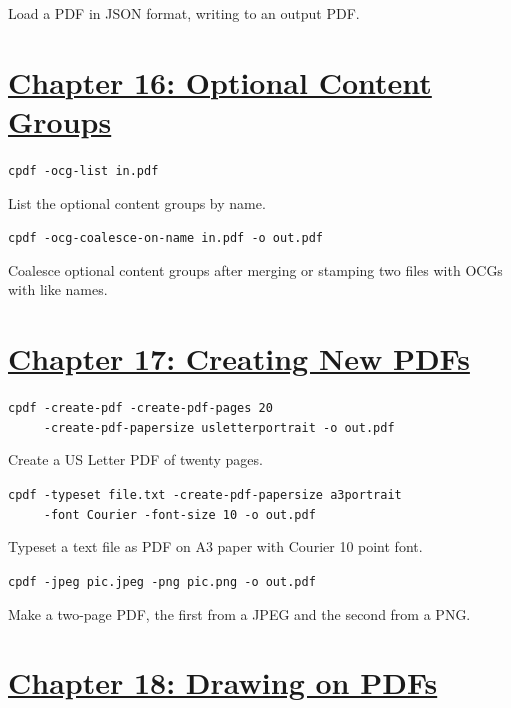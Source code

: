 \documentclass{book}
\begin{document}
\noindent Load a PDF in JSON format, writing to an output PDF.

\section*{\hyperref[chap:16]{Chapter 16: Optional Content Groups}}

\begin{framed}\noindent\texttt{cpdf -ocg-list in.pdf}\end{framed}

\noindent List the optional content groups by name.

\begin{framed}\noindent\texttt{cpdf -ocg-coalesce-on-name in.pdf -o out.pdf}\end{framed}

\noindent Coalesce optional content groups after merging or stamping two files with OCGs with like names.

\section*{\hyperref[chap:17]{Chapter 17: Creating New PDFs}}

\begin{framed}
 \noindent\small\verb?cpdf -create-pdf -create-pdf-pages 20?\\
 \noindent\small\verb?     -create-pdf-papersize usletterportrait -o out.pdf?
\end{framed}

\noindent Create a US Letter PDF of twenty pages.

\begin{framed}
 \noindent\small\verb?cpdf -typeset file.txt -create-pdf-papersize a3portrait?\\
 \noindent\small\verb?     -font Courier -font-size 10 -o out.pdf?
\end{framed}

\noindent Typeset a text file as PDF on A3 paper with Courier 10 point font.

\begin{framed}\noindent\texttt{cpdf -jpeg pic.jpeg -png pic.png -o out.pdf}\end{framed}

\noindent Make a two-page PDF, the first from a JPEG and the second from a PNG.

\section*{\hyperref[chap:18]{Chapter 18: Drawing on PDFs}}
\end{document}
